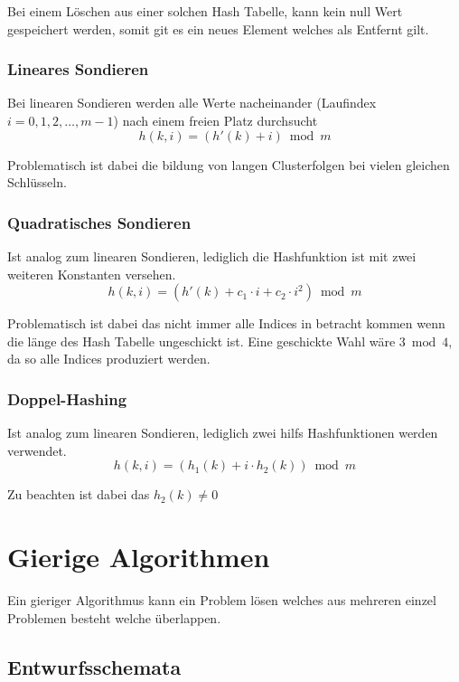 \documentclass[10pt,a4paper]{article}
\begin{document}
\begin{multicols*}{4}
Bei einem Löschen aus einer solchen Hash Tabelle, kann kein null Wert gespeichert werden, somit git es ein neues Element
welches als Entfernt gilt.

\subsubsection*{Lineares Sondieren}
Bei linearen Sondieren werden alle Werte nacheinander (Laufindex \(i = 0,1,2,\dots,m-1\)) nach einem freien Platz
durchsucht \[h(k,i) = (h'(k) + i) \bmod m\]

Problematisch ist dabei die bildung von langen Clusterfolgen bei vielen gleichen Schlüsseln.

\subsubsection*{Quadratisches Sondieren}
Ist analog zum linearen Sondieren, lediglich die Hashfunktion ist mit zwei weiteren Konstanten versehen.
\[h(k,i) = (h'(k) + c_{1} \cdot i + c_{2} \cdot i^{2}) \bmod m\]

Problematisch ist dabei das nicht immer alle Indices in betracht kommen wenn die länge des Hash Tabelle ungeschickt ist.
Eine geschickte Wahl wäre \(3 \bmod 4\), da so alle Indices produziert werden.

\subsubsection*{Doppel-Hashing}
Ist analog zum linearen Sondieren, lediglich zwei hilfs Hashfunktionen werden verwendet.
\[h(k,i) = \left(h_{1}(k) + i \cdot h_{2}(k)\right) \bmod m\]

Zu beachten ist dabei das \(h_{2}(k) \neq 0\)

\section{Gierige Algorithmen}

Ein gieriger Algorithmus kann ein Problem lösen welches aus mehreren einzel Problemen besteht welche überlappen.

\subsection{Entwurfsschemata}


\end{multicols*}
\end{document}
